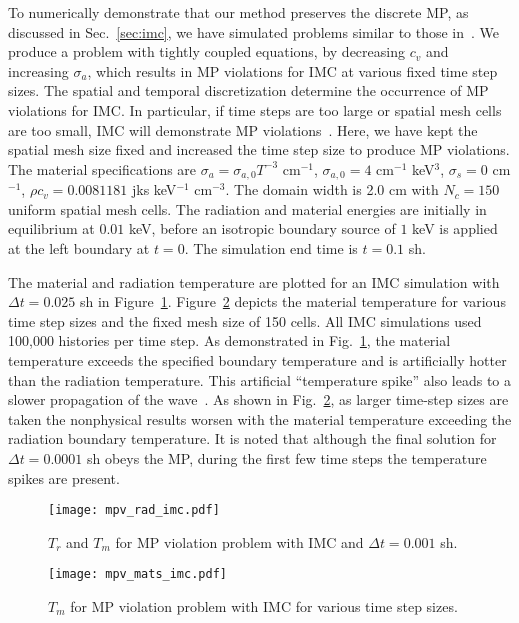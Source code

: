 To numerically demonstrate that our method preserves the discrete MP, as discussed in
Sec.~\ref{sec:imc},  we have simulated problems similar to those
in~\cite{wollaber2013discrete}.  We produce a problem with tightly coupled
equations, by decreasing $c_v$ and increasing $\sigma_a$, which results in MP violations for IMC at various fixed time step sizes. 
The spatial and temporal discretization determine the occurrence of MP violations for
IMC. In particular, if time steps are too large or spatial
mesh cells are too small, IMC will demonstrate MP violations~\cite{wollaber2013discrete}.  Here, we have kept the
spatial mesh size fixed and increased the time step size to produce MP violations.
The material specifications are  $\sigma_{a} = \sigma_{a,0} T^{-3}$ cm$^{-1}$,
$\sigma_{a,0} = 4$ cm$^{-1}$ keV$^3$, $\sigma_s=0$ cm$^{-1}$, $\rho c_v = 0.0081181$
jks keV$^{-1}$ cm$^{-3}$.  The domain width is 2.0 cm with
$N_c=150$ uniform spatial mesh cells.  The radiation and material energies are initially in
equilibrium at $0.01$ keV, before an isotropic boundary source of $1$ keV is applied at
the left boundary at $t=0$. The simulation end time is $t=0.1$ sh. 

The material and radiation temperature are plotted for an IMC simulation with $\Delta
t=0.025$ sh in Figure~\ref{fig:imc_mpvrad}.  Figure~\ref{fig:imc_mpv} depicts the material temperature
for various time step sizes and the fixed mesh size of 150 cells. All IMC
simulations used 100,000 histories per time step. As demonstrated in
Fig.~\ref{fig:imc_mpvrad}, the material temperature exceeds the specified boundary
temperature and is artificially hotter than the radiation temperature.  This artificial
``temperature spike'' also leads to a slower propagation of the
wave~\cite{wollaber2013discrete}.  As shown in
Fig.~\ref{fig:imc_mpv}, as larger time-step sizes are taken the nonphysical results
worsen with the material temperature exceeding the radiation boundary temperature.
It is noted that although the final solution for $\Delta t=0.0001$ sh obeys the MP, during
the first few time steps the temperature spikes are present.
\begin{figure}[htbp]
    \centering
    \texttt{[image: mpv\_rad\_imc.pdf]}
    \caption{\label{fig:imc_mpvrad}$T_r$ and $T_m$ for MP violation problem with IMC and $\Delta t = 0.001$ sh.}
\end{figure}
\begin{figure}[htbp]
    \centering
    \texttt{[image: mpv\_mats\_imc.pdf]}
    \caption{\label{fig:imc_mpv}$T_m$ for MP violation problem with IMC for various time step
    sizes.}
\end{figure}

